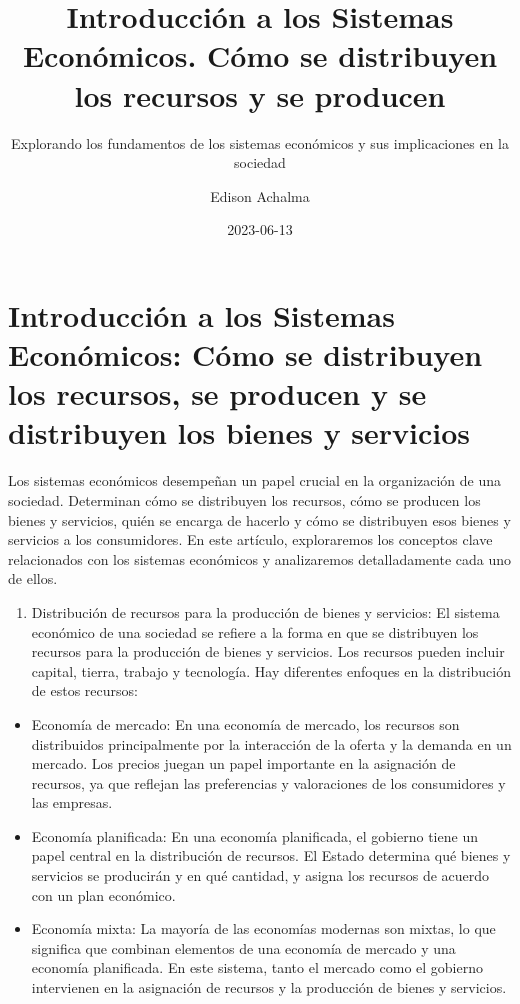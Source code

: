 \documentclass[
  letterpaper,
  DIV=11,
  numbers=noendperiod]{scrartcl}
\title{Introducción a los Sistemas Económicos. Cómo se distribuyen los
recursos y se producen}
\subtitle{Explorando los fundamentos de los sistemas económicos y sus
implicaciones en la sociedad}
\author{Edison Achalma}
\date{2023-06-13}
\providecommand{\tightlist}{%
  \setlength{\itemsep}{0pt}\setlength{\parskip}{0pt}}\usepackage{longtable,booktabs,array}
\begin{document}
\maketitle
\ifdefined\Shaded\renewenvironment{Shaded}{\begin{tcolorbox}[interior hidden, borderline west={3pt}{0pt}{shadecolor}, frame hidden, enhanced, sharp corners, breakable, boxrule=0pt]}{\end{tcolorbox}}\fi

\hypertarget{introducciuxf3n-a-los-sistemas-econuxf3micos-cuxf3mo-se-distribuyen-los-recursos-se-producen-y-se-distribuyen-los-bienes-y-servicios}{%
\section{Introducción a los Sistemas Económicos: Cómo se distribuyen los
recursos, se producen y se distribuyen los bienes y
servicios}\label{introducciuxf3n-a-los-sistemas-econuxf3micos-cuxf3mo-se-distribuyen-los-recursos-se-producen-y-se-distribuyen-los-bienes-y-servicios}}

Los sistemas económicos desempeñan un papel crucial en la organización
de una sociedad. Determinan cómo se distribuyen los recursos, cómo se
producen los bienes y servicios, quién se encarga de hacerlo y cómo se
distribuyen esos bienes y servicios a los consumidores. En este
artículo, exploraremos los conceptos clave relacionados con los sistemas
económicos y analizaremos detalladamente cada uno de ellos.

\begin{enumerate}
\def\labelenumi{\arabic{enumi}.}
\tightlist
\item
  Distribución de recursos para la producción de bienes y servicios: El
  sistema económico de una sociedad se refiere a la forma en que se
  distribuyen los recursos para la producción de bienes y servicios. Los
  recursos pueden incluir capital, tierra, trabajo y tecnología. Hay
  diferentes enfoques en la distribución de estos recursos:
\end{enumerate}

\begin{itemize}
\item
  Economía de mercado: En una economía de mercado, los recursos son
  distribuidos principalmente por la interacción de la oferta y la
  demanda en un mercado. Los precios juegan un papel importante en la
  asignación de recursos, ya que reflejan las preferencias y
  valoraciones de los consumidores y las empresas.
\item
  Economía planificada: En una economía planificada, el gobierno tiene
  un papel central en la distribución de recursos. El Estado determina
  qué bienes y servicios se producirán y en qué cantidad, y asigna los
  recursos de acuerdo con un plan económico.
\item
  Economía mixta: La mayoría de las economías modernas son mixtas, lo
  que significa que combinan elementos de una economía de mercado y una
  economía planificada. En este sistema, tanto el mercado como el
  gobierno intervienen en la asignación de recursos y la producción de
  bienes y servicios.
\end{itemize}
\end{document}
